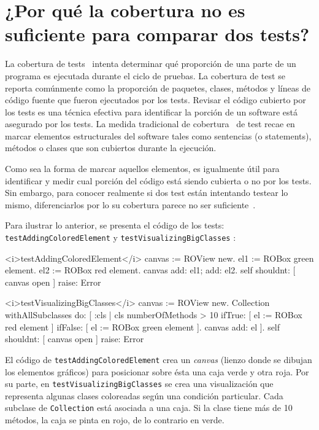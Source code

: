 \chapter{¿Por qué la cobertura no es suficiente para comparar dos tests?}

\par La cobertura de tests~\cite{Horwi02a} intenta determinar qué proporción de una parte de un programa es ejecutada durante el ciclo de pruebas. La cobertura de test se reporta comúnmente como la proporción de paquetes, clases, métodos y líneas de código fuente que fueron ejecutados por los tests. Revisar el código cubierto por los tests es una técnica efectiva para identificar la porción de un software está asegurado por los tests. La medida tradicional de cobertura~\cite{Mock09a,Piwo93a} de test recae en marcar elementos estructurales del software tales como sentencias (o statements), métodos o clases que son cubiertos durante la ejecución.

\par Como sea la forma de marcar aquellos elementos, es igualmente útil para identificar y medir cual porción del código está siendo cubierta o no por los tests. Sin embargo, para conocer realmente si dos test están intentando testear lo mismo, diferenciarlos por lo su cobertura parece no ser suficiente~\cite{van2001refactoring,greiler2012test}.    

\par Para ilustrar lo anterior, se presenta el código de los tests: {\tt testAddingColoredElement} y {\tt testVisualizingBigClasses} :

\begin{codeWithLineNumbers}
<i>testAddingColoredElement</i>
	canvas := ROView new.
	el1 := ROBox green element.
	el2 := ROBox red element.
	canvas add: el1; add: el2.
	self shouldnt: [ canvas open ] raise: Error

<i>testVisualizingBigClasses</i>
	canvas := ROView new.
	Collection withAllSubclasses do: [ :cls |
		cls numberOfMethods > 10
			ifTrue: [ el := ROBox red element ]
			ifFalse: [ el := ROBox green element ].
		canvas add: el ].
	self shouldnt: [ canvas open ] raise: Error
\end{codeWithLineNumbers} 

\par El código de {\tt testAddingColoredElement} crea un \emph{canvas} (lienzo donde se dibujan los elementos gráficos) para posicionar sobre ésta una caja verde y otra roja. Por su parte, en {\tt testVisualizingBigClasses} se crea una visualización que representa algunas clases coloreadas según una condición particular. Cada subclase de {\tt Collection} está asociada a una caja. Si la clase tiene más de 10 métodos, la caja se pinta en rojo, de lo contrario en verde. 

